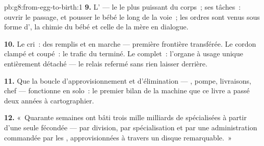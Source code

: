\begin{solution}{pb:g8:from-egg-to-birth:1}
\textbf{9.} L' --- le  le plus puissant du corps~; ses
tâches~: ouvrir le passage, et pousser le bébé le long de la voie~;
les ordres sont venus sous forme d', la chimie du bébé et
celle de la mère en dialogue.

\textbf{10.} Le cri~: des  remplis et en marche --- première
frontière transférée. Le cordon clampé et coupé~: le trafic du
 terminé. Le  complet~: l'organe à usage unique
entièrement détaché --- le relais refermé sans rien laisser derrière.

\textbf{11.} Que la boucle d'approvisionnement et d'élimination ---
, pompe, livraisons, chef --- fonctionne en solo~: le premier
bilan de la machine que ce livre a passé deux années à cartographier.

\textbf{12.} «~Quarante semaines ont bâti trois mille milliards de
 spécialisées à partir d'une seule  fécondée ---
par division, par spécialisation et par une administration commandée
par les , approvisionnées à travers un disque remarquable.~»
\end{solution}

